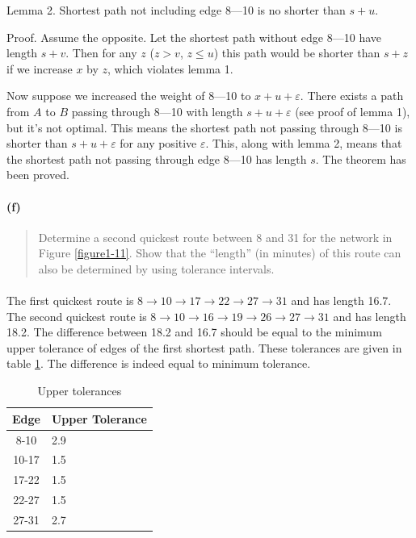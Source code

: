 Lemma 2. Shortest path not including edge 8---10 is no shorter than $s+u$.

Proof. Assume the opposite. Let the shortest path without edge 8---10 have length $s+v$. Then for any $z$ ($z>v$, $z \leq u$) this path would be shorter than $s+z$ if we increase $x$ by $z$, which violates lemma 1.

Now suppose we increased the weight of 8---10 to $x+u+\varepsilon$. There exists a path from $A$ to $B$ passing through 8---10 with length $s+u+\varepsilon$ (see proof of lemma 1), but it's not optimal. This means the shortest path not passing through 8---10 is shorter than $s+u+\varepsilon$ for any positive $\varepsilon$. This, along with lemma 2, means that the shortest path not passing through edge 8---10 has length $s$. The theorem has been proved.

\paragraph{(f)}

\begin{quote}
Determine a second quickest route between 8 and 31 for the network in Figure \ref{figure1-11}. Show that the “length” (in minutes) of this route can also be determined by using tolerance intervals.
\end{quote}

\paragraph{}
The first quickest route is $ 8 \rightarrow 10 \rightarrow 17 \rightarrow 22 \rightarrow 27 \rightarrow 31 $ and has length 16.7. The second quickest route is $ 8 \rightarrow 10 \rightarrow 16 \rightarrow 19 \rightarrow 26 \rightarrow 27 \rightarrow 31 $ and has length 18.2. The difference between 18.2 and 16.7 should be equal to the minimum upper tolerance of edges of the first shortest path. These tolerances are given in table \ref{tolerances-1-2f}. The difference is indeed equal to minimum tolerance.

\begin{table}[H]
\centering
\begin{tabular}{|c|l|}
\hline
Edge & Upper Tolerance \\ \hline
8-10 & 2.9 \\ \hline
10-17 & 1.5 \\ \hline
17-22 & 1.5 \\ \hline
22-27 & 1.5 \\ \hline
27-31 & 2.7 \\ \hline
\end{tabular}
\caption{Upper tolerances}
\label{tolerances-1-2f}
\end{table}

